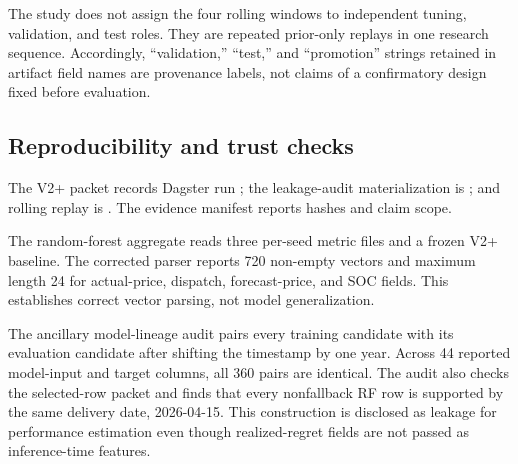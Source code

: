 The study does not assign the four rolling windows to independent tuning, validation, and test roles. They are repeated prior-only replays in one research sequence. Accordingly, ``validation,'' ``test,'' and ``promotion'' strings retained in artifact field names are provenance labels, not claims of a confirmatory design fixed before evaluation.

\subsection{Reproducibility and trust checks}

The V2+ packet records Dagster run ; the leakage-audit materialization is ; and rolling replay is . The evidence manifest reports hashes and claim scope.

The random-forest aggregate reads three per-seed metric files and a frozen V2+ baseline. The corrected parser reports 720 non-empty vectors and maximum length 24 for actual-price, dispatch, forecast-price, and SOC fields. This establishes correct vector parsing, not model generalization.

The ancillary model-lineage audit pairs every training candidate with its
evaluation candidate after shifting the timestamp by one year. Across 44
reported model-input and target columns, all 360 pairs are identical. The audit
also checks the selected-row packet and finds that every nonfallback RF row is
supported by the same delivery date, 2026-04-15. This construction is disclosed
as leakage for performance estimation even though realized-regret fields are
not passed as inference-time features.
